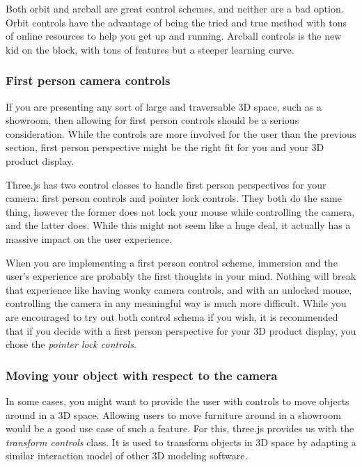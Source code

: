 \documentclass[10pt,final,journal,compsoc]{IEEEtran}
\begin{document}
        Both orbit and arcball are great control schemes, and neither are a bad option. Orbit controls have the advantage of being the tried and true method with tons of online resources to help you get up and running. Arcball controls is the new kid on the block, with tons of features but a steeper learning curve.
    
        \subsubsection{First person camera controls}
        If you are presenting any sort of large and traversable 3D space, such as a showroom, then allowing for first person controls should be a serious consideration. While the controls are more involved for the user than the previous section, first person perspective might be the right fit for you and your 3D product display.
        
        Three.js has two control classes to handle first person perspectives for your camera: first person controls and pointer lock controls. They both do the same thing, however the former does not lock your mouse while controlling the camera, and the latter does. While this might not seem like a huge deal, it actually has a massive impact on the user experience.
        
        When you are implementing a first person control scheme, immersion and the user's experience are probably the first thoughts in your mind. Nothing will break that experience like having wonky camera controls, and with an unlocked mouse, controlling the camera in any meaningful way is much more difficult. While you are encouraged to try out both control schema if you wish, it is recommended that if you decide with a first person perspective for your 3D product display, you chose the \textit{pointer lock controls}.
        
        \subsubsection{Moving your object with respect to the camera} \label{transform_controls}
        In some cases, you might want to provide the user with controls to move objects around in a 3D space. Allowing users to move furniture around in a showroom would be a good use case of such a feature. For this, three.js provides us with the \textit{transform controls} class. It is used to transform objects in 3D space by adapting a similar interaction model of other 3D modeling software.
        
\end{document}
